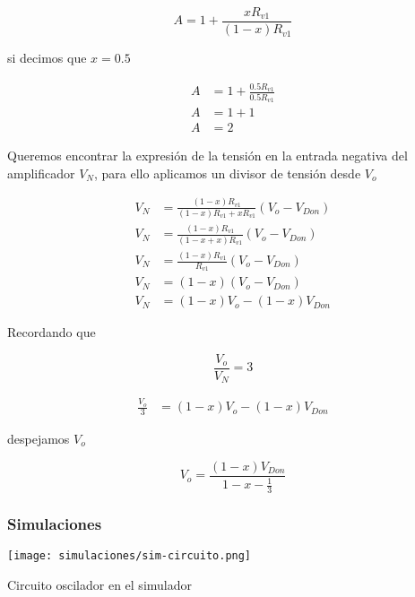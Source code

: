 \begin{equation}
    A = 1 + \frac{x R_{v1}}{(1-x)R_{v1}}
\end{equation}

si decimos que $x=0.5$ 

\begin{align*}
    A &= 1 + \frac{0.5 R_{v1}}{0.5 R_{v1}} \\
    A &= 1 + 1 \\
    A &= 2
\end{align*}

Queremos encontrar la expresión de la tensión en la entrada negativa del amplificador $V_N$, para ello aplicamos un divisor de tensión desde $V_o$

\begin{align*}
    V_N &= \frac{(1-x)R_{v1}}{(1-x)R_{v1} + x R_{v1}}(V_o - V_{Don}) \\
    V_N &= \frac{(1-x)R_{v1}}{(1-x +x)R_{v1}}(V_o - V_{Don})\\
    V_N &= \frac{(1-x)R_{v1}}{R_{v1}}(V_o - V_{Don}) \\
    V_N &= (1-x)(V_o - V_{Don}) \\
    V_N &= (1-x)V_o - (1-x)V_{Don} 
\end{align*}

Recordando que 

\begin{equation}
    \frac{V_o}{V_N} = 3
\end{equation}

\begin{align*}
    \frac{V_o}{3} &= (1-x)V_o - (1-x)V_{Don} 
\end{align*}

despejamos $V_o$

\begin{equation}
    V_o = \frac{(1-x)V_{Don}}{1-x - \frac{1}{3}}
\end{equation}

\paragraph{}

\FloatBarrier
\subsubsection{Simulaciones}

\begin{ilustracion}[hb]
    \centering
    \texttt{[image: simulaciones/sim-circuito.png]}
    \caption{Circuito oscilador en el simulador}
    \label{ilus:simulacion-circuito}
\end{ilustracion}

